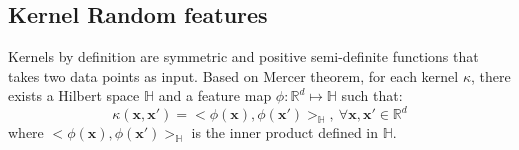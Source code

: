 \documentclass{article}
\begin{document}



\iffalse
\subsection{Kernel Random features}\label{sec:Random_features}
Kernels by definition are symmetric and positive  semi-definite functions that takes two data points as input. Based on Mercer theorem, for each kernel $\kappa$, there exists a Hilbert space $\mathbb{H}$ and a  feature map $\phi:\mathbb{R}^d\mapsto\mathbb{H}$ such that:  
	\begin{equation}
	\label{eq:kernel_main_equation}
	\kappa(\mathbf{x},\mathbf{x}')=<\phi(\mathbf{x}),\phi(\mathbf{x}')>_\mathbb{H},~ \forall \mathbf{x},\mathbf{x}'\in\mathbb{R}^d
	\end{equation}
	where $<\phi(\mathbf{x}),\phi(\mathbf{x}')>_\mathbb{H}$ is the inner product defined in $\mathbb{H}$.
\end{document}
